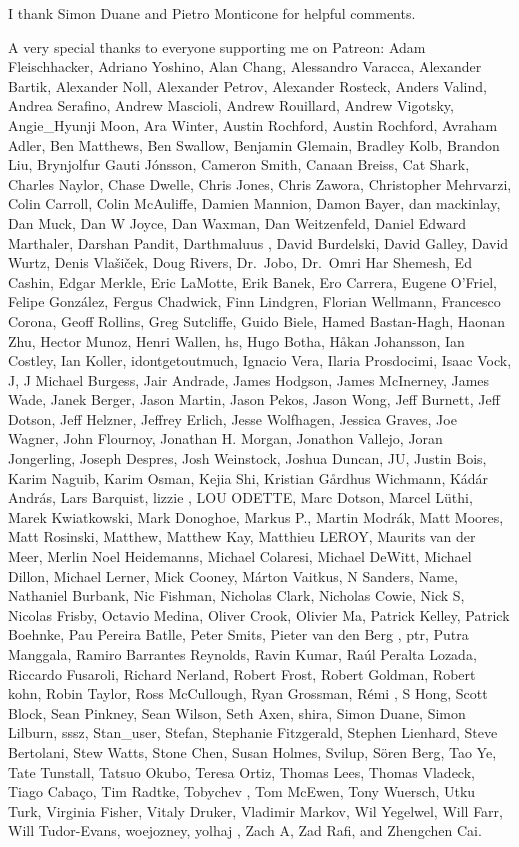 \documentclass[
  letterpaper,
  DIV=11,
  numbers=noendperiod]{scrartcl}
\begin{document}
I thank Simon Duane and Pietro Monticone for helpful comments.

A very special thanks to everyone supporting me on Patreon: Adam
Fleischhacker, Adriano Yoshino, Alan Chang, Alessandro Varacca,
Alexander Bartik, Alexander Noll, Alexander Petrov, Alexander Rosteck,
Anders Valind, Andrea Serafino, Andrew Mascioli, Andrew Rouillard,
Andrew Vigotsky, Angie\_Hyunji Moon, Ara Winter, Austin Rochford, Austin
Rochford, Avraham Adler, Ben Matthews, Ben Swallow, Benjamin Glemain,
Bradley Kolb, Brandon Liu, Brynjolfur Gauti Jónsson, Cameron Smith,
Canaan Breiss, Cat Shark, Charles Naylor, Chase Dwelle, Chris Jones,
Chris Zawora, Christopher Mehrvarzi, Colin Carroll, Colin McAuliffe,
Damien Mannion, Damon Bayer, dan mackinlay, Dan Muck, Dan W Joyce, Dan
Waxman, Dan Weitzenfeld, Daniel Edward Marthaler, Darshan Pandit,
Darthmaluus , David Burdelski, David Galley, David Wurtz, Denis
Vlašiček, Doug Rivers, Dr.~Jobo, Dr.~Omri Har Shemesh, Ed Cashin, Edgar
Merkle, Eric LaMotte, Erik Banek, Ero Carrera, Eugene O'Friel, Felipe
González, Fergus Chadwick, Finn Lindgren, Florian Wellmann, Francesco
Corona, Geoff Rollins, Greg Sutcliffe, Guido Biele, Hamed Bastan-Hagh,
Haonan Zhu, Hector Munoz, Henri Wallen, hs, Hugo Botha, Håkan Johansson,
Ian Costley, Ian Koller, idontgetoutmuch, Ignacio Vera, Ilaria
Prosdocimi, Isaac Vock, J, J Michael Burgess, Jair Andrade, James
Hodgson, James McInerney, James Wade, Janek Berger, Jason Martin, Jason
Pekos, Jason Wong, Jeff Burnett, Jeff Dotson, Jeff Helzner, Jeffrey
Erlich, Jesse Wolfhagen, Jessica Graves, Joe Wagner, John Flournoy,
Jonathan H. Morgan, Jonathon Vallejo, Joran Jongerling, Joseph Despres,
Josh Weinstock, Joshua Duncan, JU, Justin Bois, Karim Naguib, Karim
Osman, Kejia Shi, Kristian Gårdhus Wichmann, Kádár András, Lars
Barquist, lizzie , LOU ODETTE, Marc Dotson, Marcel Lüthi, Marek
Kwiatkowski, Mark Donoghoe, Markus P., Martin Modrák, Matt Moores, Matt
Rosinski, Matthew, Matthew Kay, Matthieu LEROY, Maurits van der Meer,
Merlin Noel Heidemanns, Michael Colaresi, Michael DeWitt, Michael
Dillon, Michael Lerner, Mick Cooney, Márton Vaitkus, N Sanders, Name,
Nathaniel Burbank, Nic Fishman, Nicholas Clark, Nicholas Cowie, Nick S,
Nicolas Frisby, Octavio Medina, Oliver Crook, Olivier Ma, Patrick
Kelley, Patrick Boehnke, Pau Pereira Batlle, Peter Smits, Pieter van den
Berg , ptr, Putra Manggala, Ramiro Barrantes Reynolds, Ravin Kumar, Raúl
Peralta Lozada, Riccardo Fusaroli, Richard Nerland, Robert Frost, Robert
Goldman, Robert kohn, Robin Taylor, Ross McCullough, Ryan Grossman, Rémi
, S Hong, Scott Block, Sean Pinkney, Sean Wilson, Seth Axen, shira,
Simon Duane, Simon Lilburn, sssz, Stan\_user, Stefan, Stephanie
Fitzgerald, Stephen Lienhard, Steve Bertolani, Stew Watts, Stone Chen,
Susan Holmes, Svilup, Sören Berg, Tao Ye, Tate Tunstall, Tatsuo Okubo,
Teresa Ortiz, Thomas Lees, Thomas Vladeck, Tiago Cabaço, Tim Radtke,
Tobychev , Tom McEwen, Tony Wuersch, Utku Turk, Virginia Fisher, Vitaly
Druker, Vladimir Markov, Wil Yegelwel, Will Farr, Will Tudor-Evans,
woejozney, yolhaj , Zach A, Zad Rafi, and Zhengchen Cai.
\end{document}
